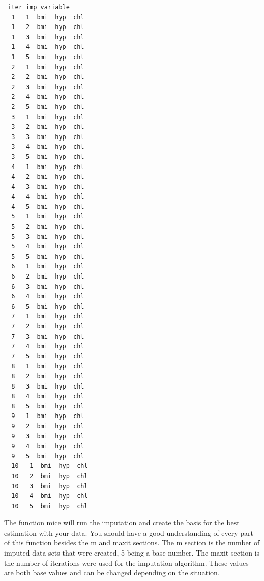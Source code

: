 \documentclass[
  letterpaper,
  DIV=11,
  numbers=noendperiod]{scrreprt}
\begin{document}
\begin{enumerate}
\begin{verbatim}
 iter imp variable
  1   1  bmi  hyp  chl
  1   2  bmi  hyp  chl
  1   3  bmi  hyp  chl
  1   4  bmi  hyp  chl
  1   5  bmi  hyp  chl
  2   1  bmi  hyp  chl
  2   2  bmi  hyp  chl
  2   3  bmi  hyp  chl
  2   4  bmi  hyp  chl
  2   5  bmi  hyp  chl
  3   1  bmi  hyp  chl
  3   2  bmi  hyp  chl
  3   3  bmi  hyp  chl
  3   4  bmi  hyp  chl
  3   5  bmi  hyp  chl
  4   1  bmi  hyp  chl
  4   2  bmi  hyp  chl
  4   3  bmi  hyp  chl
  4   4  bmi  hyp  chl
  4   5  bmi  hyp  chl
  5   1  bmi  hyp  chl
  5   2  bmi  hyp  chl
  5   3  bmi  hyp  chl
  5   4  bmi  hyp  chl
  5   5  bmi  hyp  chl
  6   1  bmi  hyp  chl
  6   2  bmi  hyp  chl
  6   3  bmi  hyp  chl
  6   4  bmi  hyp  chl
  6   5  bmi  hyp  chl
  7   1  bmi  hyp  chl
  7   2  bmi  hyp  chl
  7   3  bmi  hyp  chl
  7   4  bmi  hyp  chl
  7   5  bmi  hyp  chl
  8   1  bmi  hyp  chl
  8   2  bmi  hyp  chl
  8   3  bmi  hyp  chl
  8   4  bmi  hyp  chl
  8   5  bmi  hyp  chl
  9   1  bmi  hyp  chl
  9   2  bmi  hyp  chl
  9   3  bmi  hyp  chl
  9   4  bmi  hyp  chl
  9   5  bmi  hyp  chl
  10   1  bmi  hyp  chl
  10   2  bmi  hyp  chl
  10   3  bmi  hyp  chl
  10   4  bmi  hyp  chl
  10   5  bmi  hyp  chl
\end{verbatim}
\end{enumerate}

The function mice will run the imputation and create the basis for the
best estimation with your data. You should have a good understanding of
every part of this function besides the m and maxit sections. The m
section is the number of imputed data sets that were created, 5 being a
base number. The maxit section is the number of iterations were used for
the imputation algorithm. These values are both base values and can be
changed depending on the situation.
\end{document}
